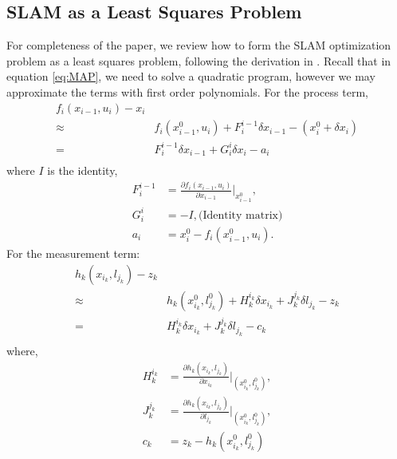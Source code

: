 \appendix
\subsection{SLAM as a Least Squares Problem}
\label{appendix:leastsquare}
For completeness of the paper, we review how to form the SLAM optimization problem as a least squares problem, following the derivation in \cite{isam}. Recall that in equation \ref{eq:MAP}, we need to solve a quadratic program, however we may approximate the terms with first order polynomials. For the process term,
\begin{equation}
\begin{aligned}
f_i(x_{i-1}, u_i) - x_i\\
\approx & {f_i(x_{i-1}^0, u_i)} + F_i^{i-1}\delta x_{i-1} - (x_i^0 + \delta x_i)\\
=& F_i^{i-1}\delta x_{i-1} + G_i^i\delta x_i - a_i \\
\end{aligned}
\label{eq:linearProcessTerm}
\end{equation}
where $I$ is the identity, %
\begin{equation*}
\begin{aligned}
F_i^{i-1} &= \frac{\partial f_i(x_{i-1}, u_i)}{\partial x_{i-1}}|_{x_{i-1}^0}, \label{F} \\%
 G_i^i &= -I, \text{(Identity matrix)}\\%
a_i &= x_i^0 - f_i(x_{i-1}^0, u_i).
\end{aligned}
\end{equation*}
For the measurement term:
\begin{equation}
\begin{aligned}
h_k(x_{i_k}, l_{j_k}) - z_k\\
\approx & {h_k(x_{i_k}^0, l_{j_k}^0) + H_k^{i_k}\delta x_{i_k} + J_k^{j_k}\delta l_{j_k}} - z_k\\
= & {H_k^{i_k}\delta x_{i_k} + J_k^{j_k}\delta l_{j_k}} - c_k\\
\end{aligned}
\label{eq:linearMeasurementTerm}
\end{equation}
where, %
\begin{equation*}
\begin{aligned}
H_k^{i_k} &= \frac{\partial h_k(x_{i_k}, l_{j_k})}{\partial x_{i_k}}|_{(x_{i_k}^0, l_{j_k}^0)}, \\ 
J_k^{j_k} &= \frac{\partial h_k(x_{i_k}, l_{j_k})}{\partial l_{j_k}}|_{(x_{i_k}^0, l_{j_k}^0)} , \\
 c_k &= z_k - h_k(x_{i_k}^0, l_{j_k}^0)
\end{aligned}
\end{equation*}
